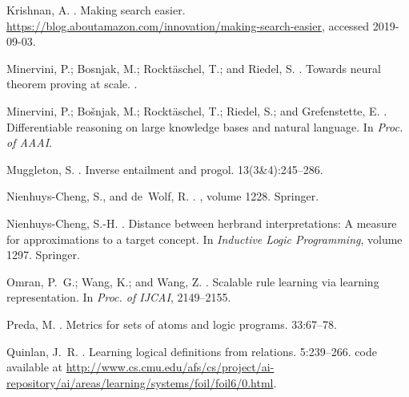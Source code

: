 \documentclass[letterpaper]{article} \usepackage{aaai20}  \usepackage{times}  \usepackage{helvet} \usepackage{courier}  \usepackage[hyphens]{url}  \usepackage{graphicx} \urlstyle{rm} \def\UrlFont{\rm}  \usepackage{graphicx}  \frenchspacing  \setlength{\pdfpagewidth}{8.5in}  \setlength{\pdfpageheight}{11in}  \usepackage{amsthm}
\theoremstyle{definition}
\begin{document}
\begin{thebibliography}{}
Krishnan, A.
.
\newblock Making search easier.
\newblock \url{https://blog.aboutamazon.com/innovation/making-search-easier},
  accessed 2019-09-03.

Minervini, P.; Bosnjak, M.; Rockt{\"{a}}schel, T.; and Riedel, S.
.
\newblock Towards neural theorem proving at scale.
.

Minervini, P.; Bošnjak, M.; Rocktäschel, T.; Riedel, S.; and Grefenstette, E.
.
\newblock Differentiable reasoning on large knowledge bases and natural
  language.
\newblock In {\em Proc. of AAAI}.

Muggleton, S.
.
\newblock Inverse entailment and progol.
 13(3{\&}4):245--286.

Nienhuys-Cheng, S., and de~Wolf, R.
.
, volume 1228.
\newblock Springer.

Nienhuys-Cheng, S.-H.
.
\newblock Distance between herbrand interpretations: A measure for
  approximations to a target concept.
\newblock In {\em Inductive Logic Programming}, volume 1297.
\newblock Springer.

Omran, P.~G.; Wang, K.; and Wang, Z.
.
\newblock Scalable rule learning via learning representation.
\newblock In {\em Proc. of IJCAI},  2149--2155.

Preda, M.
.
\newblock Metrics for sets of atoms and logic programs.
 33:67--78.

Quinlan, J.~R.
.
\newblock Learning logical definitions from relations.
 5:239--266.
\newblock code available at
  \url{http://www.cs.cmu.edu/afs/cs/project/ai-repository/ai/areas/learning/systems/foil/foil6/0.html}.


\end{thebibliography}
\end{document}
